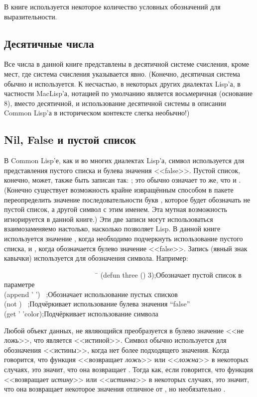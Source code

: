 В книге используется некоторое количество условных обозначений для выразительности. 

\subsection{Десятичные числа}

Все числа в данной книге представлены в десятичной системе счисления, кроме мест,
где система счисления указывается явно. 
(Конечно, десятичная система обычно и используется.
К несчастью, в некоторых других диалектах Lisp'а, в частности MacLisp'а,
нотацией по умолчанию является восьмеричная (основание 8), вместо десятичной, и
использование десятичной системы в описании Common Lisp'а в историческом
контексте слегка необычно!) 

\subsection{Nil, False и пустой список}

В Common Lisp'е, как и во многих диалектах Lisp'а, символ  используется
для представления пустого списка и булева значения <<false>>. Пустой список,
конечно, может, также быть записан так: \cd{()}; это обычно означает то же, что
и .
(Конечно существует возможность крайне извращённым способом в пакете
переопределить значение последовательности букв , которое будет 
обозначать не пустой список, а другой символ с этим именем. Эта мутная
возможность игнорируется в данной книге.)
Эти две записи могут использоваться взаимозаменяемо настолько, насколько
позволяет Lisp. В данной книге используется значение {\emptylist}, когда необходимо
подчеркнуть использование пустого списка, и {\false}, когда обозначается булево
значение <<false>>. Запись  (явный знак кавычки) используется для
обозначения символа.
Например:
\begin{lisp}
~~~~~~~~~~~~~~~~~~~~~~~~~~~\=\kill
(defun three () 3)\>;{\rm Обозначает пустой список в параметре} \\
(append '{\emptylist} '{\emptylist}) \EV\ {\emptylist}\>;{\rm Обозначает использование
пустых списков} \\
(not {\false}) \EV\ {\true}\>;{\rm Подчёркивает использование булева значения ``false''} \\
(get '{\nil} 'color)\>;{\rm Подчёркивает использование символа}
\end{lisp}

Любой объект данных, не являющийся {\false} преобразуется в булево значение
<<не ложь>>, что является <<истиной>>. Символ {\true} обычно используется для
обозначения <<истины>>, когда нет более подходящего значения.
Когда говорится, что функция <<возвращает \emph{ложь}>> или <<\emph{ложна}>>
в некоторых случаях, это значит, что она возвращает {\false}.
Тогда как, если говорится, что функция <<возвращает \emph{истину}>> или
<<\emph{истинна}>> в некоторых случаях, это значит, что она возвращает некоторое
значения отличное от {\false}, но необязательно {\true}.

